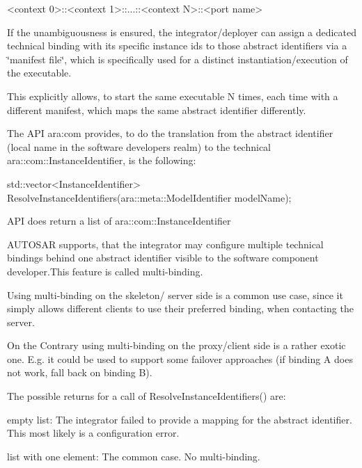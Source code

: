 \begin{DoxyCode}
<context 0>::<context 1>::...::<context N>::<port name>
\end{DoxyCode}
 If the unambiguousness is ensured, the integrator/deployer can assign a dedicated technical binding with its specific instance ids to those abstract identifiers via a \char`\"{}manifest file\char`\"{}, which is specifically used for a distinct instantiation/execution of the executable.
\begin{DoxyItemize}
\item This explicitly allows, to start the same executable N times, each time with a different manifest, which maps the same abstract identifier differently.
\item The A\+PI ara\+:com provides, to do the translation from the abstract identifier (local name in the software developers realm) to the technical ara\+::com\+::\+Instance\+Identifier, is the following\+:
\end{DoxyItemize}


\begin{DoxyCode}
std::vector<InstanceIdentifier> ResolveInstanceIdentifiers(ara::meta::ModelIdentifier modelName);
\end{DoxyCode}

\begin{DoxyItemize}
\item A\+PI does return a list of ara\+::com\+::\+Instance\+Identifier
\item A\+U\+T\+O\+S\+AR supports, that the integrator may configure multiple technical bindings behind one abstract identifier visible to the software component developer.\+This feature is called multi-\/binding.
\item Using multi-\/binding on the skeleton/ server side is a common use case, since it simply allows different clients to use their preferred binding, when contacting the server.
\item On the Contrary using multi-\/binding on the proxy/client side is a rather exotic one. E.\+g. it could be used to support some failover approaches (if binding A does not work, fall back on binding B).
\item The possible returns for a call of Resolve\+Instance\+Identifiers() are\+:
\begin{DoxyItemize}
\item empty list\+: The integrator failed to provide a mapping for the abstract identifier. This most likely is a configuration error.
\item list with one element\+: The common case. No multi-\/binding.
\end{DoxyItemize}
\end{DoxyItemize}


